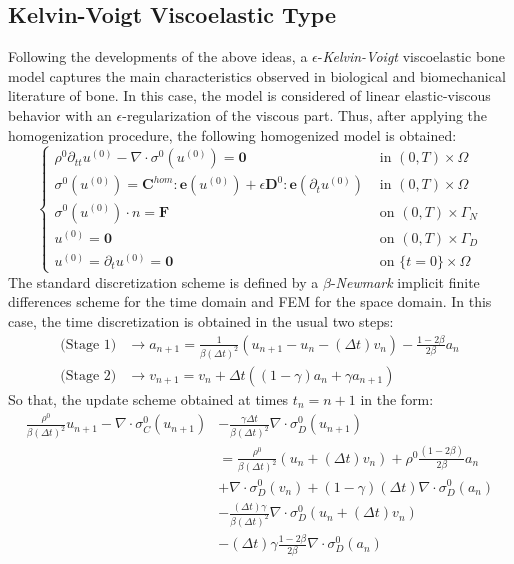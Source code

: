 \subsection{Kelvin-Voigt Viscoelastic Type}
Following the developments of the above ideas, a $\epsilon$-\textit{Kelvin-Voigt} viscoelastic bone model captures the main characteristics observed in biological and biomechanical literature of bone. In this case, the model is considered of linear elastic-viscous behavior with an $\epsilon$-regularization of the viscous part.
Thus, after applying the homogenization procedure, the following homogenized model is obtained:
\begin{equation*}
    \left \{
    \begin{array}{cc}
        \rho^{0} \partial_{tt} u^{(0)} - \nabla \cdot \sigma^{0}(u^{(0)}) = \mathbf{0} & \text{ in } (0,T)\times\Omega\\
        \sigma^{0}(u^{(0)}) =  \mathbf{C}^{hom}:\mathbf{e}(u^{(0)}) + \epsilon \mathbf{D}^{0}:\mathbf{e}(\partial_{t}u^{(0)}) & \text{ in }(0,T)\times \Omega\\
        \sigma^{0}(u^{(0)})\cdot n = \mathbf{F} & \text{ on }(0,T)\times\Gamma_N\\
        u^{(0)} = \mathbf{0} & \text{ on }(0,T)\times\Gamma_D \\
        u^{(0)} = \partial_t u^{(0)} = \mathbf{0} &  \text{ on } \{t=0\}\times\Omega
    \end{array}
    \right .
\end{equation*}
The standard discretization scheme is defined by a $\beta$-\textit{Newmark} implicit finite differences scheme for the time domain and FEM for the space domain. In this case, the time discretization is obtained in the usual two steps:
\begin{align*}
    \text{(Stage 1)} &\longrightarrow a_{n+1} = \frac{1}{\beta (\Delta t)^2} (u_{n+1}-u_{n}-(\Delta t)v_n) - \frac{1-2\beta}{2\beta}a_n\\
    \text{(Stage 2)}& \longrightarrow v_{n+1} = v_n + \Delta t((1-\gamma)a_n + \gamma a_{n+1})
\end{align*}
So that, the update scheme obtained at times $t_n = n+1$ in the form:
\begin{align*}
    \frac{\rho^{0}}{\beta (\Delta t)^2} u_{n+1} - \nabla \cdot \sigma_C^{0}( u_{n+1})  & - \frac{\gamma \Delta t}{\beta (\Delta t)^2} \nabla \cdot \sigma_D^{0}(u_{n+1}) \\
    &= \frac{\rho^{0}}{\beta (\Delta t)^2} (u_n + (\Delta t)v_n) + \rho^{0}\frac{ (1-2\beta)}{2\beta} a_n \\
    & + \nabla \cdot \sigma_D^{0}(v_n) + (1-\gamma)(\Delta t) \nabla\cdot \sigma_D^{0}(a_n) \\
    & - \frac{(\Delta t)\gamma}{\beta (\Delta t)^2}\nabla \cdot \sigma_D^{0}(u_n + (\Delta t)v_n) \\
    & - (\Delta t)\gamma\frac{1-2\beta}{2 \beta} \nabla \cdot \sigma_D^{0}(a_n)
\end{align*}

